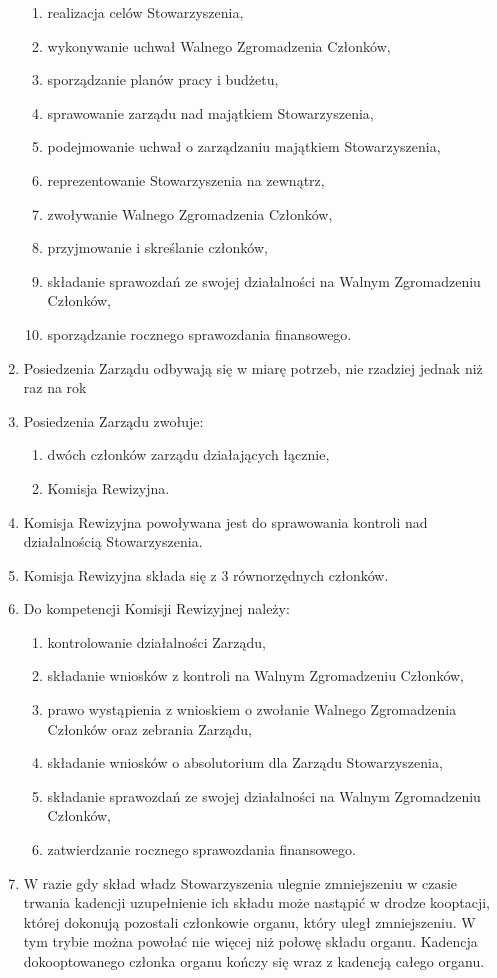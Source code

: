 \documentclass{article}
\begin{document}
\begin{enumerate}
      \begin{enumerate}
        \item realizacja celów Stowarzyszenia,
        \item wykonywanie uchwał Walnego Zgromadzenia Członków,
        \item sporządzanie planów pracy i budżetu,
        \item sprawowanie zarządu nad majątkiem Stowarzyszenia,
        \item podejmowanie uchwał o zarządzaniu majątkiem Stowarzyszenia,
        \item reprezentowanie Stowarzyszenia na zewnątrz,
        \item zwoływanie Walnego Zgromadzenia Członków,
        \item przyjmowanie i skreślanie członków,
        \item składanie sprawozdań ze swojej działalności na Walnym Zgromadzeniu Członków,
        \item sporządzanie rocznego sprawozdania finansowego.
      \end{enumerate}
    \item Posiedzenia Zarządu odbywają się w miarę potrzeb, nie rzadziej jednak niż raz na rok
    \item Posiedzenia Zarządu zwołuje:
      \begin{enumerate}
        \item dwóch członków zarządu działających łącznie,
        \item Komisja Rewizyjna.
      \end{enumerate}
    \item Komisja Rewizyjna powoływana jest do sprawowania kontroli nad działalnością Stowarzyszenia.
    \item Komisja Rewizyjna składa się z 3 równorzędnych członków.
    \item Do kompetencji Komisji Rewizyjnej należy:
      \begin{enumerate}
        \item kontrolowanie działalności Zarządu,
        \item składanie wniosków z kontroli na Walnym Zgromadzeniu Członków,
        \item prawo wystąpienia z wnioskiem o zwołanie Walnego Zgromadzenia Członków oraz zebrania Zarządu,
        \item składanie wniosków o absolutorium dla Zarządu Stowarzyszenia,
        \item składanie sprawozdań ze swojej działalności na Walnym Zgromadzeniu Członków,
        \item zatwierdzanie rocznego sprawozdania finansowego.
      \end{enumerate}
    \item W razie gdy skład władz Stowarzyszenia ulegnie zmniejszeniu w czasie trwania kadencji uzupełnienie ich składu może nastąpić w drodze kooptacji, której dokonują pozostali członkowie organu, który uległ zmniejszeniu. W tym trybie można powołać nie więcej niż połowę składu organu. Kadencja dokooptowanego członka organu kończy się wraz z kadencją całego organu.
  \end{enumerate}
\end{document}
